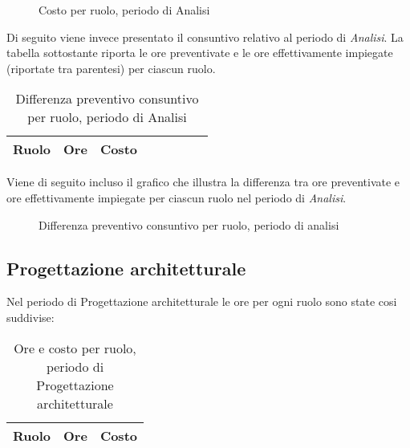 \begin{figure}[H]
\begin{tikzpicture}

	

\end{tikzpicture}
\caption{Costo per ruolo, periodo di Analisi}
\end{figure}

Di seguito viene invece presentato il consuntivo relativo al periodo di \textit{Analisi}. La tabella sottostante riporta le ore preventivate e le ore effettivamente impiegate (riportate tra parentesi) per ciascun ruolo.

\begin{table}[H]
\centering
\begin{tabular}{lccccccc}
\toprule
    \textbf{Ruolo}  & \textbf{Ore} & \textbf{Costo} \\
    \midrule
    
    	
    
    \bottomrule
\end{tabular}
\caption{Differenza preventivo consuntivo per ruolo, periodo di Analisi}
\end{table}

Viene di seguito incluso il grafico che illustra la differenza tra ore preventivate e ore effettivamente impiegate per ciascun ruolo nel periodo di \textit{Analisi}.

\begin{figure}[H]
\centering
{}
\caption{Differenza preventivo consuntivo per ruolo, periodo di analisi}
\end{figure}

\subsection{Progettazione architetturale}

Nel periodo di Progettazione architetturale le ore per ogni ruolo sono state cosi suddivise:

\begin{table}[H]
	\centering
	\begin{tabular}{ l c c }
	\textbf{Ruolo} & \textbf{Ore} & \textbf{Costo} \\
	\hline
	
		
	
	\end{tabular}
	\caption{Ore e costo per ruolo, periodo di Progettazione architetturale}
	\end{table}
	
